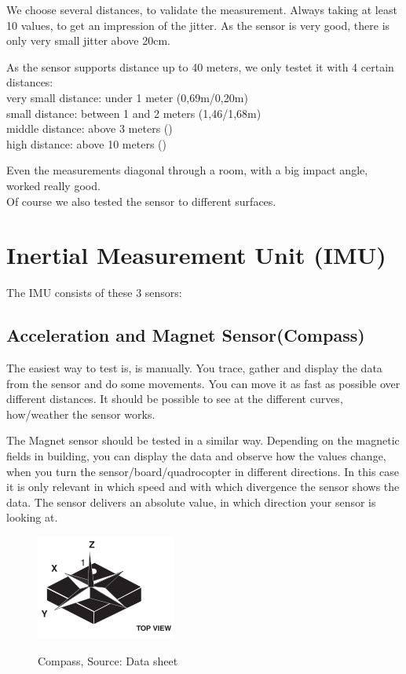 We choose several distances, to validate the measurement. Always taking at least 10 values, to get an impression of the jitter. As the sensor is very good, there is only very small jitter above 20cm.

As the sensor supports distance up to 40 meters, we only testet it with 4 certain distances:\\
very small distance: under 1 meter (0,69m/0,20m)\\
small distance: between 1 and 2 meters (1,46/1,68m)\\
middle distance: above 3 meters ()\\
high distance: above 10 meters ()

Even the measurements diagonal through a room, with a big impact angle, worked really good.\\
Of course we also tested the sensor to different surfaces.


\section{Inertial Measurement Unit (IMU)}

The IMU consists of these 3 sensors:

\subsection{Acceleration and Magnet Sensor(Compass)}

The easiest way to test is, is manually. You trace, gather and display the data from the sensor and do some movements. You can move it as fast as possible over different distances. It should be possible to see at the different curves, how/weather the sensor works.

The Magnet sensor should be tested in a similar way. Depending on the magnetic fields in building, you can display the data and observe how the values change, when you turn the sensor/board/quadrocopter in different directions. In this case it is only relevant in which speed and with which divergence the sensor shows the data. The sensor delivers an absolute value, in which direction your sensor is looking at.


\begin{figure}[H]
	\centering
		\includegraphics{fig/compass.png}%
	\label{fig:IMU_com}
	\caption{Compass, Source: Data sheet}
\end{figure}


